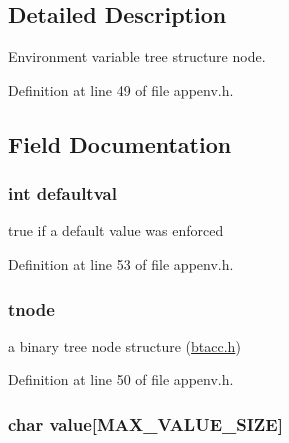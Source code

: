 \subsection{Detailed Description}
Environment variable tree structure node. 

Definition at line 49 of file appenv.\-h.



\subsection{Field Documentation}
\hypertarget{struct_e_n_v___n_o_d_e_aa9f01a4b3b28015d5f847a3bd7b5885c}{
\subsubsection[{defaultval}]{\setlength{\rightskip}{0pt plus 5cm}int defaultval}}\label{struct_e_n_v___n_o_d_e_aa9f01a4b3b28015d5f847a3bd7b5885c}


true if a default value was enforced 



Definition at line 53 of file appenv.\-h.

\hypertarget{struct_e_n_v___n_o_d_e_a868f3bf6a758b3a4f5d07a72237d44c8}{
\subsubsection[{tnode}]{ tnode}}\label{struct_e_n_v___n_o_d_e_a868f3bf6a758b3a4f5d07a72237d44c8}


a binary tree node structure (\hyperlink{btacc_8h}{btacc.\-h}) 



Definition at line 50 of file appenv.\-h.

\hypertarget{struct_e_n_v___n_o_d_e_a46d06749d2c33796cffe83de819ebeea}{
\subsubsection[{value}]{\setlength{\rightskip}{0pt plus 5cm}char value\mbox{[}{\bf M\-A\-X\-\_\-\-V\-A\-L\-U\-E\-\_\-\-S\-I\-Z\-E}\mbox{]}}}\label{struct_e_n_v___n_o_d_e_a46d06749d2c33796cffe83de819ebeea}



